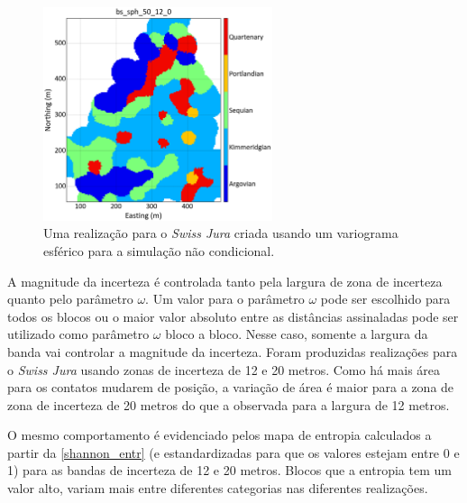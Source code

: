 \begin{figure}[H]
	\caption{\label{sph_jura} Uma realização para o \textit{Swiss Jura} criada usando um variograma esférico para a simulação não condicional.}
	\centering
		\includegraphics[width=0.6\textwidth]{capitulo_3/imagens/sph_real_0_50_12.png}
\end{figure}

A magnitude da incerteza é controlada tanto pela largura de zona de incerteza quanto pelo parâmetro $\omega$. Um valor para o parâmetro $\omega$ pode ser escolhido para todos os blocos ou o maior valor absoluto entre as distâncias assinaladas pode ser utilizado como parâmetro $\omega$ bloco a bloco. Nesse caso, somente a largura da banda vai controlar a magnitude da incerteza. Foram produzidas realizações para o \textit{Swiss Jura} usando zonas de incerteza de 12 e 20 metros. Como há mais área para os contatos mudarem de posição, a variação de área é maior para a zona de zona de incerteza de 20 metros do que a observada para a largura de 12 metros.

O mesmo comportamento é evidenciado pelos mapa de entropia calculados a partir da \autoref{shannon_entr} (e estandardizadas para que os valores estejam entre 0 e 1) para as bandas de incerteza de 12 e 20 metros. Blocos que a entropia tem um valor alto, variam mais entre diferentes categorias nas diferentes realizações.

